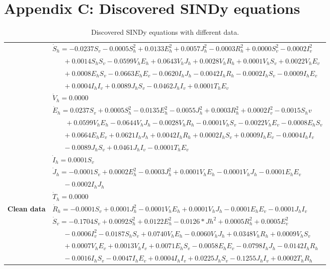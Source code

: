 \documentclass[9pt]{article}
\numberwithin{equation}{section}
\begin{document}
\section*{Appendix C: Discovered SINDy equations}\label{appendixB}
\begin{table}[ht]
    \caption{Discovered SINDy equations with different data.}
    \label{table6}
    \begin{tabularx}{1\linewidth}{|l|X|}
        \hline
        & $\dot{S}_h=-0.0237S_v-0.0005S_h^2+0.0133E_h^2+0.0057J_h^2-0.0003R_h^2+0.0000S_v^2-0.0002I_v^2$ \\
        & $\quad\;\;+0.0014S_hS_v-0.0599V_hE_h+0.0643V_hJ_h+0.0028V_hR_h+0.0001V_hS_v+0.0022V_hE_v$ \\
        & $\quad\;\;+0.0008E_hS_v-0.0663E_hE_v-0.0620I_hJ_h-0.0042I_hR_h-0.0002I_hS_v-0.0009I_hE_v$ \\
        & $\quad\;\;+0.0004I_hI_v+0.0089J_hS_v-0.0462J_hI_v+0.0001T_hE_v$ \\
        & $\dot{V}_h=0.0000$ \\
        & $\dot{E}_h=0.0237S_v+0.0005S_h^2-0.0135E_h^2-0.0055J_h^2+0.0003R_h^2+0.0002I_v^2-0.0015S_hv$ \\
        & $\quad\;\;\;+0.0599V_hE_h-0.0644V_hJ_h-0.0028V_hR_h-0.0001V_hS_v-0.0022V_hE_v-0.0008E_hS_v$ \\
        & $\quad\;\;+0.0664E_hE_v+0.0621I_hJ_h+0.0042I_hR_h+0.0002I_hS_v+0.0009I_hE_v-0.0004I_hI_v$ \\
        & $\quad\;\;-0.0089J_hS_v+0.0461J_hI_v-0.0001T_hE_v$ \\
        & $\dot{I}_h=0.0001S_v$ \\
        & $\dot{J}_h=-0.0001S_v+0.0002E_h^2-0.0003J_h^2+0.0001V_hE_h-0.0001V_hJ_h-0.0001E_hE_v$ \\
        & $\quad\;\;-0.0002I_hJ_h$ \\
        & $\dot{T}_h=0.0000$ \\
        \textbf{Clean data} & $\dot{R}_h=-0.0001S_v+0.0001J_h^2-0.0001V_hE_h+0.0001V_hJ_h-0.0001E_hE_v-0.0001J_hI_v$ \\
        & $\dot{S}_v=-0.1704S_v+0.0092S_h^2+0.0122E_h^2-0.0126*Jh^2+0.0005R_h^2+0.0005E_v^2$ \\
        & $\quad\;\;-0.0006I_v^2-0.0187S_hS_v+0.0740V_hE_h-0.0060V_hJ_h+0.0348V_hR_h+0.0009V_hS_v$ \\
        & $\quad\;\;+0.0007V_hE_v+0.0013V_hI_v+0.0071E_hS_v-0.0058E_hE_v-0.0798I_hJ_h-0.0142I_hR_h$ \\
        & $\quad\;\;-0.0016I_hS_v-0.0047I_hE_v+0.0004I_hI_v+0.0225J_hS_v-0.1255J_hI_v+0.0002T_hR_h$ \\

\end{tabularx}
\end{table}
\end{document}
